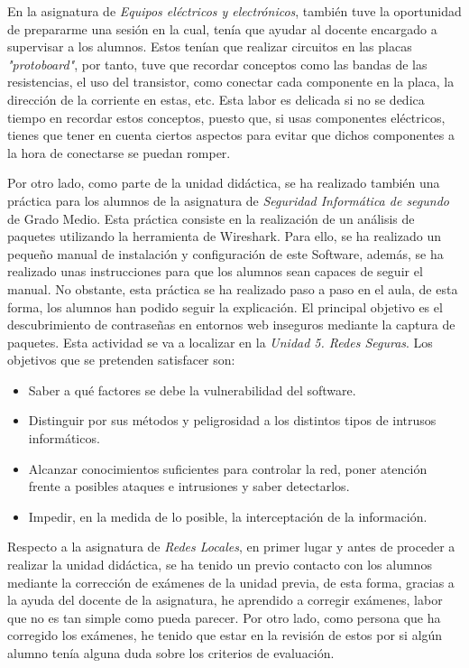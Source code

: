 \documentclass[spanish,12pt, a4paper,twoside]{paper}
\begin{document}
En la asignatura de \textit{Equipos eléctricos y electrónicos}, también tuve la oportunidad de prepararme una sesión en la cual, tenía que ayudar al docente encargado a supervisar a los alumnos. Estos tenían que realizar circuitos en las placas \textit{"protoboard"}, por tanto, tuve que recordar conceptos como las bandas de las resistencias, el uso del transistor, como conectar cada componente en la placa, la dirección de la corriente en estas, etc. Esta labor es delicada si no se dedica tiempo en recordar estos conceptos, puesto que, si usas componentes eléctricos, tienes que tener en cuenta ciertos aspectos para evitar que dichos componentes a la hora de conectarse se puedan romper.


Por otro lado, como parte de la unidad didáctica, se ha realizado también una práctica para los alumnos de la asignatura de \textit{Seguridad Informática de segundo} de Grado Medio. Esta práctica consiste en la realización de un análisis de paquetes utilizando la herramienta de Wireshark. Para ello, se ha realizado un pequeño manual de instalación y configuración de este Software, además, se ha realizado unas instrucciones para que los alumnos sean capaces de seguir el manual. No obstante, esta práctica se ha realizado paso a paso en el aula, de esta forma, los alumnos han podido seguir la explicación. El principal objetivo es el descubrimiento de contraseñas en entornos web inseguros mediante la captura de paquetes. Esta actividad se va a localizar en la \textit{Unidad 5. Redes Seguras}. Los objetivos que se pretenden satisfacer son:
\begin{itemize}
\item Saber a qué factores se debe la vulnerabilidad del software.
\item Distinguir por sus métodos y peligrosidad a los distintos tipos de intrusos informáticos.
\item Alcanzar conocimientos suficientes para controlar la red, poner atención frente a posibles ataques e intrusiones y saber detectarlos.
\item Impedir, en la medida de lo posible, la interceptación de la información.
\end{itemize}


Respecto a la asignatura de \textit{Redes Locales}, en primer lugar y antes de proceder a realizar la unidad didáctica, se ha tenido un previo contacto con los alumnos mediante la corrección de exámenes de la unidad previa, de esta forma, gracias a la ayuda del docente de la asignatura, he aprendido a corregir exámenes, labor que no es tan simple como pueda parecer. Por otro lado, como persona que ha corregido los exámenes, he tenido que estar en la revisión de estos por si algún alumno tenía alguna duda sobre los criterios de evaluación.
\end{document}
